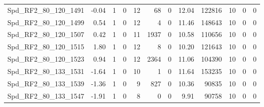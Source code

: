\begin{longtable}[c]{@{}lrrrrrrrrrrr@{}}
Spd\_RF2\_80\_120\_1491      & -0.04                  & 1                       & 0                       & 12                     & 68                      & 0                       & 12.04                   & 122816                   & 10                       & 0                        & 0                        \\
Spd\_RF2\_80\_120\_1499      & 0.54                   & 1                       & 0                       & 12                     & 4                       & 0                       & 11.46                   & 148643                   & 10                       & 0                        & 0                        \\
Spd\_RF2\_80\_120\_1507      & 0.42                   & 1                       & 0                       & 11                     & 1937                    & 0                       & 10.58                   & 110656                   & 10                       & 0                        & 0                        \\
Spd\_RF2\_80\_120\_1515      & 1.80                   & 1                       & 0                       & 12                     & 8                       & 0                       & 10.20                   & 121643                   & 10                       & 0                        & 0                        \\
Spd\_RF2\_80\_120\_1523      & 0.94                   & 1                       & 0                       & 12                     & 2364                    & 0                       & 11.06                   & 104390                   & 10                       & 0                        & 0                        \\
Spd\_RF2\_80\_133\_1531      & -1.64                  & 1                       & 0                       & 10                     & 1                       & 0                       & 11.64                   & 153235                   & 10                       & 0                        & 0                        \\
Spd\_RF2\_80\_133\_1539      & -1.36                  & 1                       & 0                       & 9                      & 827                     & 0                       & 10.36                   & 90835                    & 10                       & 0                        & 0                        \\
Spd\_RF2\_80\_133\_1547      & -1.91                  & 1                       & 0                       & 8                      & 0                       & 0                       & 9.91                    & 90758                    & 10                       & 0                        & 0                        \\

\end{longtable}
